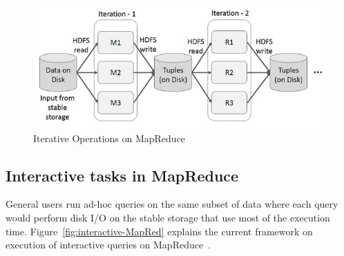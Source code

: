 
\begin{figure}[!ht]
  \centering\includegraphics[width=\columnwidth]{images/iterative-MapReduce.png}
   \caption{Iterative Operations on MapReduce 
   ~\cite{hid-sp18-410-spark-RDD}}\label{fig:iterative-MapRed}
\end{figure}









\subsection{Interactive tasks in MapReduce}

General users run ad-hoc queries on the same subset of data where each query 
would perform disk I/O on the stable storage that use most of the execution time.
Figure~\ref{fig:interactive-MapRed} explains the current framework on execution 
of interactive queries on MapReduce~\cite{hid-sp18-410-spark-RDD}.






